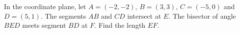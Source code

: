 In the coordinate plane, let $A=(-2,-2)$, $B=(3,3)$, $C=(-5,0)$ and $D=(5,1)$. The segments $AB$ and $CD$ intersect at $E$. The bisector of angle $BED$ meets segment $BD$ at $F$. Find the length $EF$.
